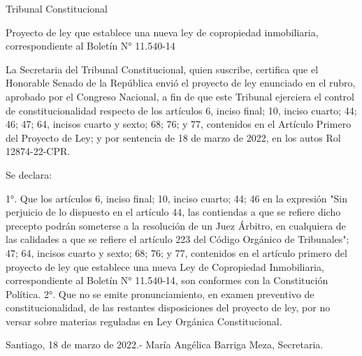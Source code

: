     Tribunal Constitucional
     
    Proyecto de ley que establece una nueva ley de copropiedad inmobiliaria, correspondiente al Boletín N° 11.540-14
     
    La Secretaria del Tribunal Constitucional, quien suscribe, certifica que el Honorable Senado de la República envió el proyecto de ley enunciado en el rubro, aprobado por el Congreso Nacional, a fin de que este Tribunal ejerciera el control de constitucionalidad respecto de los artículos 6, inciso final; 10, inciso cuarto; 44; 46; 47; 64, incisos cuarto y sexto; 68; 76; y 77, contenidos en el Artículo Primero del Proyecto de Ley; y por sentencia de 18 de marzo de 2022, en los autos Rol 12874-22-CPR.
     
    Se declara:
     
    1°. Que los artículos 6, inciso final; 10, inciso cuarto; 44; 46 en la expresión "Sin perjuicio de lo dispuesto en el artículo 44, las contiendas a que se refiere dicho precepto podrán someterse a la resolución de un Juez Árbitro, en cualquiera de las calidades a que se refiere el artículo 223 del Código Orgánico de Tribunales"; 47; 64, incisos cuarto y sexto; 68; 76; y 77, contenidos en el artículo primero del proyecto de ley que establece una nueva Ley de Copropiedad Inmobiliaria, correspondiente al Boletín N° 11.540-14, son conformes con la Constitución Política.
    2°. Que no se emite pronunciamiento, en examen preventivo de constitucionalidad, de las restantes disposiciones del proyecto de ley, por no versar sobre materias reguladas en Ley Orgánica Constitucional.
     
    Santiago, 18 de marzo de 2022.- María Angélica Barriga Meza, Secretaria.